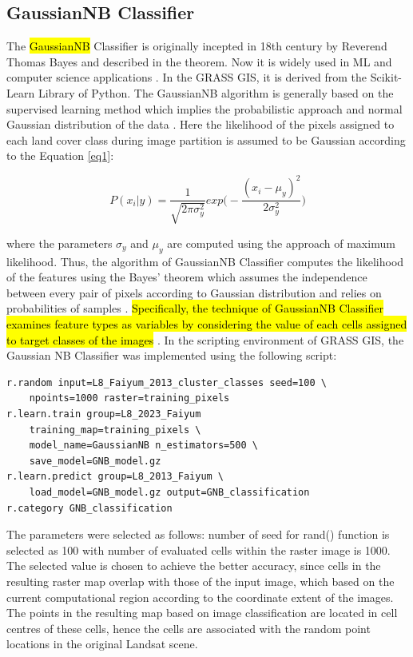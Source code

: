 \documentclass[final,5p,times,twocolumn]{elsarticle}
\numberwithin{table}{section}
\begin{document}
\subsection{GaussianNB Classifier}

The \hl{GaussianNB} Classifier is originally incepted in 18th century by Reverend Thomas Bayes and described in the theorem. Now it is widely used in ML and computer science applications \cite{Chanetal1982}. In the GRASS GIS, it is derived from the Scikit-Learn Library of Python. The GaussianNB algorithm is generally based on the supervised learning method which implies the probabilistic approach and normal Gaussian distribution of the data \cite{BERRAR2019403}. Here the likelihood of the pixels assigned to each land cover class during image partition is assumed to be Gaussian according to the Equation \ref{eq1}:

\begin{equation}
P(x_{i} | y)=\frac{1}{\sqrt{2\pi\sigma^2_y}}exp\biggl( -\frac{(x_{i}-\mu_{y})^2}{2\sigma^2_y}\biggr)
\label{eq1}
\end{equation}

where the parameters $\sigma_y$ and $\mu_y$  are computed using the approach of maximum likelihood. Thus, the algorithm of GaussianNB Classifier computes the likelihood of the features using the Bayes' theorem which assumes the independence between every pair of pixels according to Gaussian distribution and relies on probabilities of samples \cite{PERETZ2024108972}. \hl{Specifically, the technique of GaussianNB Classifier examines feature types as variables by considering the value of each cells assigned to target classes of the images} \cite{5655540}. In the scripting environment of GRASS GIS, the Gaussian NB Classifier was implemented using the following script:

\begin{footnotesize}
\begin{verbatim}
r.random input=L8_Faiyum_2013_cluster_classes seed=100 \
    npoints=1000 raster=training_pixels
r.learn.train group=L8_2023_Faiyum 
    training_map=training_pixels \
    model_name=GaussianNB n_estimators=500 \
    save_model=GNB_model.gz
r.learn.predict group=L8_2013_Faiyum \
    load_model=GNB_model.gz output=GNB_classification
r.category GNB_classification
\end{verbatim}
\end{footnotesize}

The parameters were selected as follows: number of seed for rand() function is selected as 100 with number of evaluated cells within the raster image is 1000. The selected value is chosen to achieve the better accuracy, since cells in the resulting raster map overlap with those of the input image, which based on the current computational region according to the coordinate extent of the images. The points in the resulting map based on image classification are located in cell centres of these cells, hence the cells are associated with the random point locations in the original Landsat scene.
\end{document}
